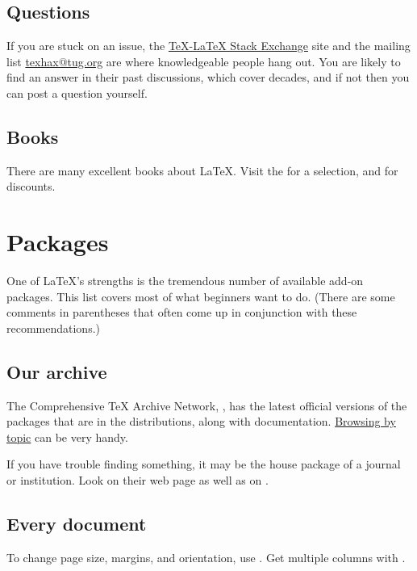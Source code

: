 \documentclass[11pt]{article}
\begin{document}
\begin{multicols*}{2}
\subsection{Questions}
If you are stuck on an issue, the
\href{https://tex.stackexchange.com/}{\TeX{}-\LaTeX{} Stack Exchange} site 
and the mailing list
\href{https://lists.tug.org/texhax}{texhax@tug.org}
are where knowledgeable people hang out. 
You are likely to find an answer in their past discussions, which cover 
decades, and if not then you can post a question yourself.


\subsection{Books}
There are many excellent books about \LaTeX{}. 
Visit the 
\href{https://tug.org/books/}
 {} for a selection, and for discounts.




\section{Packages}

One of \LaTeX's strengths is the tremendous number of available add-on
packages. 
This list covers most of what
beginners want to do.
(There are some comments in parentheses that
often come up in conjunction with these recommendations.)


\subsection{Our archive}
The Comprehensive \TeX{} Archive Network, 
\href{https://ctan.org}{\color{darkblue}\CTAN},
has the latest official versions of 
the packages that are in the distributions,
along with documentation.
\href{https://ctan.org/topics/cloud}{\color{darkblue}Browsing by topic}
can be very handy.

If you have trouble finding something, it may be
the house package of a journal or institution. 
Look on their web page as well as on \CTAN. 



\subsection{Every document}
To change page size, margins, and orientation, use 
.
Get multiple columns with .


\end{multicols*}
\end{document}

